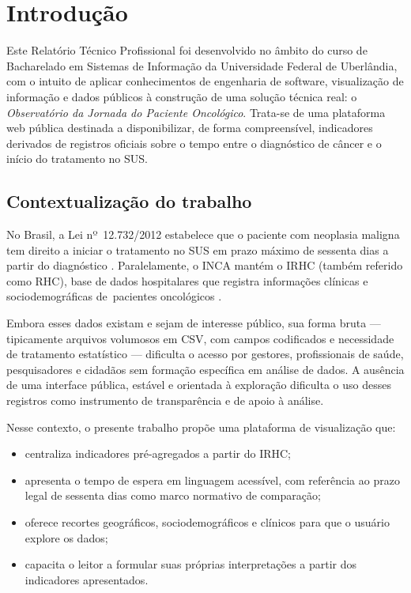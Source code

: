 \chapter[Introdução]{Introdução}
\label{cap:introducao}

Este Relatório Técnico Profissional foi desenvolvido no âmbito do curso de Bacharelado em Sistemas de Informação da Universidade Federal de Uberlândia, com o intuito de aplicar conhecimentos de engenharia de software, visualização de informação e dados públicos à construção de uma solução técnica real: o \textit{Observatório da Jornada do Paciente Oncológico}. Trata-se de uma plataforma web pública destinada a disponibilizar, de forma compreensível, indicadores derivados de registros oficiais sobre o tempo entre o diagnóstico de câncer e o início do tratamento no \acs{SUS}.

\section{Contextualização do trabalho}

No Brasil, a Lei nº~12.732/2012 estabelece que o paciente com neoplasia maligna tem direito a iniciar o tratamento no \acs{SUS} em prazo máximo de sessenta dias a partir do diagnóstico \cite{lei12732}. Paralelamente, o \acs{INCA} mantém o \acs{IRHC} (também referido como \acs{RHC}), base de dados hospitalares que registra informações clínicas e sociodemográficas de~pacientes oncológicos \cite{inca_irhc}.

Embora esses dados existam e sejam de interesse público, sua forma bruta --- tipicamente arquivos volumosos em \acs{CSV}, com campos codificados e necessidade de tratamento estatístico --- dificulta o acesso por gestores, profissionais de saúde, pesquisadores e cidadãos sem formação específica em análise de dados. A ausência de uma interface pública, estável e orientada à exploração dificulta o uso desses registros como instrumento de transparência e de apoio à análise.

Nesse contexto, o presente trabalho propõe uma plataforma de visualização que:
\begin{itemize}
	\item centraliza indicadores pré-agregados a partir do \acs{IRHC};
	\item apresenta o tempo de espera em linguagem acessível, com referência ao prazo legal de sessenta dias como marco normativo de comparação;
	\item oferece recortes geográficos, sociodemográficos e clínicos para que o usuário explore os dados;
	\item capacita o leitor a formular suas próprias interpretações a partir dos indicadores apresentados.
\end{itemize}

